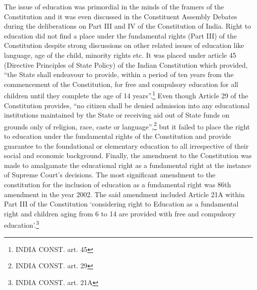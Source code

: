 \begin{multicols}{2}
\vspace{-.1cm}


\vspace{-.1cm}

\noi
The issue of education was primordial in the minds of the framers of the Constitution and it
was even discussed in the Constituent Assembly Debates during the deliberations on Part III
and IV of the Constitution of India. Right to education did not find a place under the
fundamental rights (Part III) of the Constitution despite strong discussions on other related
issues of education like language, age of the child, minority rights etc. It was placed under
article 45 (Directive Principles of State Policy) of the Indian Constitution which provided,
“the State shall endeavour to provide, within a period of ten years from the commencement of
the Constitution, for free and compulsory education for all children until they complete the
age of 14 years”.\footnote{INDIA CONST. art. 45} Even though Article 29 of the Constitution provides, “no citizen shall be
denied admission into any educational institutions maintained by the State or receiving aid
out of State funds on grounds only of religion, race, caste or language”,\footnote{INDIA CONST. art. 29} but it failed to place the right to education under the fundamental rights of the Constitution and provide guarantee
to the foundational or elementary education to all irrespective of their social and economic
background. Finally, the amendment to the Constitution was made to amalgamate the
educational right as a fundamental right at the instance of Supreme Court’s decisions. The
most significant amendment to the constitution for the inclusion of education as a
fundamental right was 86th amendment in the year 2002. The said amendment included
Article 21A within Part III of the Constitution ‘considering right to Education as a
fundamental right and children aging from 6 to 14 are provided with free and compulsory
education’.\footnote{INDIA CONST. art. 21A}

\vspace{-.1cm}


\vspace{-.1cm}


\end{multicols}
